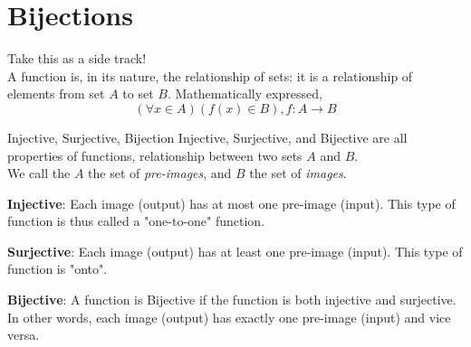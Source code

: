 \section{Bijections}
Take this as a side track! \\
A function is, in its nature, the relationship of sets: it is a relationship of elements from set $A$ to set $B$. Mathematically expressed, \\
\[(\forall x \in A) (f(x) \in B), f : A \rightarrow B\]
\begin{ln-define}{Injective, Surjective, Bijection}{}
    Injective, Surjective, and Bijective are all properties of functions, relationship between two sets $A$ and $B$. \\
    We call the $A$ the set of \textit{pre-images}, and $B$ the set of \textit{images}.
    \begin{bindenum}
        \item{
            \textbf{Injective}: Each image (output) has at most one pre-image (input). This type of function is thus called a "one-to-one" function.
            \begin{center}
            \end{center}
        }
        \item{
            \textbf{Surjective}: Each image (output) has at least one pre-image (input). This type of function is "onto".
            \begin{center}
            \end{center}
        }
        \item {
            \textbf{Bijective}: A function is Bijective if the function is both injective and surjective. In other words, each image (output) has exactly one pre-image (input) and vice versa.
        }
    \end{bindenum}
\end{ln-define}
